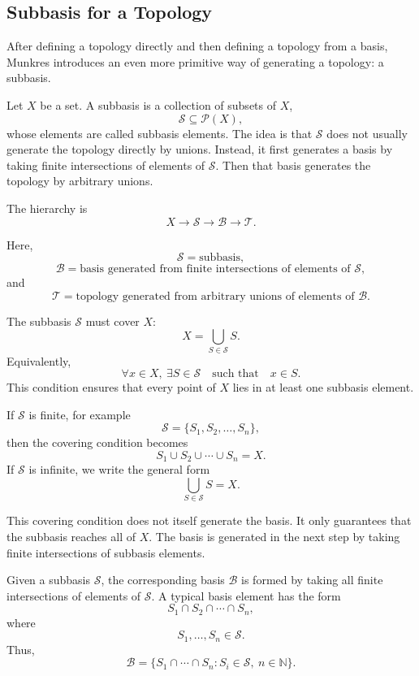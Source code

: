 \documentclass{article}
\begin{document}
	\subsection{Subbasis for a Topology}
	
	After defining a topology directly and then defining a topology from a basis, Munkres introduces an even more primitive way of generating a topology: a subbasis.
	
	Let \(X\) be a set. A subbasis is a collection of subsets of \(X\),
	$$
	\mathcal S\subseteq\mathcal P(X),
	$$
	whose elements are called subbasis elements. The idea is that \(\mathcal S\) does not usually generate the topology directly by unions. Instead, it first generates a basis by taking finite intersections of elements of \(\mathcal S\). Then that basis generates the topology by arbitrary unions.
	
	The hierarchy is
	$$
	X
	\longrightarrow
	\mathcal S
	\longrightarrow
	\mathcal B
	\longrightarrow
	\mathcal T.
	$$
	
	Here,
	$$
	\mathcal S=\text{subbasis},
	$$
	$$
	\mathcal B=\text{basis generated from finite intersections of elements of }\mathcal S,
	$$
	and
	$$
	\mathcal T=\text{topology generated from arbitrary unions of elements of }\mathcal B.
	$$
	
	The subbasis \(\mathcal S\) must cover \(X\):
	$$
	X=\bigcup_{S\in\mathcal S}S.
	$$
	Equivalently,
	$$
	\forall x\in X,\ \exists S\in\mathcal S
	\quad\text{such that}\quad
	x\in S.
	$$
	This condition ensures that every point of \(X\) lies in at least one subbasis element.
	
	If \(\mathcal S\) is finite, for example
	$$
	\mathcal S=\{S_1,S_2,\dots,S_n\},
	$$
	then the covering condition becomes
	$$
	S_1\cup S_2\cup\cdots\cup S_n=X.
	$$
	If \(\mathcal S\) is infinite, we write the general form
	$$
	\bigcup_{S\in\mathcal S}S=X.
	$$
	
	This covering condition does not itself generate the basis. It only guarantees that the subbasis reaches all of \(X\). The basis is generated in the next step by taking finite intersections of subbasis elements.
	
	Given a subbasis \(\mathcal S\), the corresponding basis \(\mathcal B\) is formed by taking all finite intersections of elements of \(\mathcal S\). A typical basis element has the form
	$$
	S_1\cap S_2\cap\cdots\cap S_n,
	$$
	where
	$$
	S_1,\dots,S_n\in\mathcal S.
	$$
	Thus,
	$$
	\mathcal B
	=
	\{S_1\cap\cdots\cap S_n:S_i\in\mathcal S,\ n\in\mathbb N\}.
	$$
	
\end{document}
